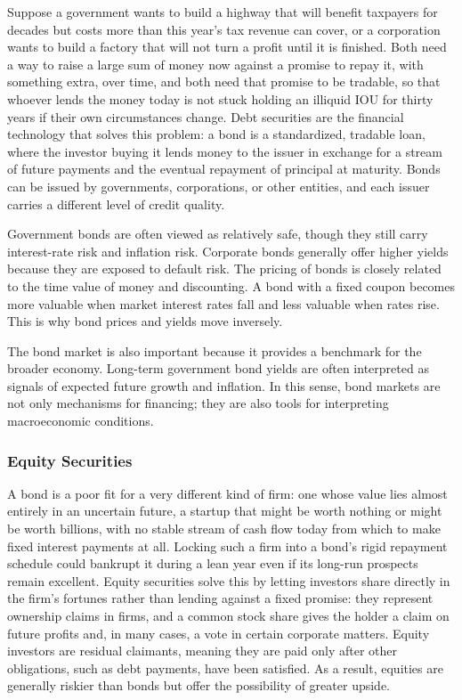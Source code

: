 \documentclass[../ai_in_finance]{subfiles}
\begin{document}
Suppose a government wants to build a highway that will benefit taxpayers for decades but costs more than this year's tax revenue can cover, or a corporation wants to build a factory that will not turn a profit until it is finished. Both need a way to raise a large sum of money now against a promise to repay it, with something extra, over time, and both need that promise to be tradable, so that whoever lends the money today is not stuck holding an illiquid IOU for thirty years if their own circumstances change.
Debt securities are the financial technology that solves this problem: a bond is a standardized, tradable loan, where the investor buying it lends money to the issuer in exchange for a stream of future payments and the eventual repayment of principal at maturity. Bonds can be issued by governments, corporations, or other entities, and each issuer carries a different level of credit quality.

Government bonds are often viewed as relatively safe, though they still carry interest-rate risk and inflation risk. Corporate bonds generally offer higher yields because they are exposed to default risk. The pricing of bonds is closely related to the time value of money and discounting. A bond with a fixed coupon becomes more valuable when market interest rates fall and less valuable when rates rise. This is why bond prices and yields move inversely.

The bond market is also important because it provides a benchmark for the broader economy. Long-term government bond yields are often interpreted as signals of expected future growth and inflation. In this sense, bond markets are not only mechanisms for financing; they are also tools for interpreting macroeconomic conditions.

\subsubsection*{Equity Securities}

A bond is a poor fit for a very different kind of firm: one whose value lies almost entirely in an uncertain future, a startup that might be worth nothing or might be worth billions, with no stable stream of cash flow today from which to make fixed interest payments at all. Locking such a firm into a bond's rigid repayment schedule could bankrupt it during a lean year even if its long-run prospects remain excellent.
Equity securities solve this by letting investors share directly in the firm's fortunes rather than lending against a fixed promise: they represent ownership claims in firms, and a common stock share gives the holder a claim on future profits and, in many cases, a vote in certain corporate matters. Equity investors are residual claimants, meaning they are paid only after other obligations, such as debt payments, have been satisfied. As a result, equities are generally riskier than bonds but offer the possibility of greater upside.
\end{document}
